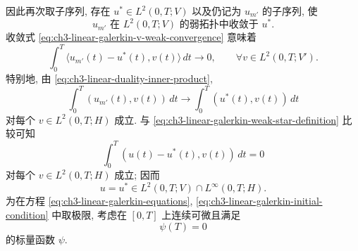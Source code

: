 因此再次取子序列, 存在 $u^*\in L^2(0,T;V)$ 以及仍记为 $u_{m'}$ 的子序列, 使
\begin{equation}
u_{m'}\text{ 在 }L^2(0,T;V)\text{ 的弱拓扑中收敛于 }u^*.
\label{eq:ch3-linear-galerkin-v-weak-convergence}
\end{equation}
收敛式 \eqref{eq:ch3-linear-galerkin-v-weak-convergence} 意味着
\[
\int_0^T\langle u_{m'}(t)-u^*(t),v(t)\rangle\,dt\longrightarrow0,
\qquad\forall v\in L^2(0,T;V').
\]
特别地, 由 \eqref{eq:ch3-linear-duality-inner-product},
\begin{equation}
\int_0^T(u_{m'}(t),v(t))\,dt
\longrightarrow\int_0^T(u^*(t),v(t))\,dt
\label{eq:ch3-linear-galerkin-h-pairing-limit}
\end{equation}
对每个 $v\in L^2(0,T;H)$ 成立. 与 \eqref{eq:ch3-linear-galerkin-weak-star-definition} 比较可知
\begin{equation}
\int_0^T(u(t)-u^*(t),v(t))\,dt=0
\label{eq:ch3-linear-identification-integral}
\end{equation}
对每个 $v\in L^2(0,T;H)$ 成立; 因而
\begin{equation}
u=u^*\in L^2(0,T;V)\cap L^\infty(0,T;H).
\label{eq:ch3-linear-limit-solution-spaces}
\end{equation}
为在方程 \eqref{eq:ch3-linear-galerkin-equations}, \eqref{eq:ch3-linear-galerkin-initial-condition} 中取极限, 考虑在 $[0,T]$ 上连续可微且满足
\begin{equation}
\psi(T)=0
\label{eq:ch3-linear-time-test-terminal-condition}
\end{equation}
的标量函数 $\psi$.

